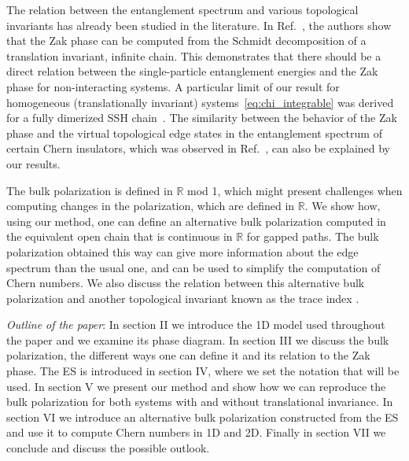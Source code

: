 \documentclass[twocolumn,amsmath,longbibliography,amssymb,superscriptaddress]{revtex4-1}
\begin{document}
The relation between the entanglement spectrum and various topological invariants has already been studied in the literature. 
In Ref.~\cite{Zaletel2014}, the authors show that the Zak phase can be computed from the Schmidt decomposition of a translation invariant, infinite chain. 
This demonstrates that there should be a direct relation between the single-particle entanglement energies and the Zak phase for non-interacting systems. A particular limit of our result for homogeneous (translationally invariant) systems~\eqref{eq:chi_integrable} was derived 
for a fully dimerized SSH chain~\cite{Ryu2006}. 
The similarity between the behavior of the Zak phase and the virtual topological edge states in the entanglement spectrum of certain Chern insulators, which was observed in Ref.~\cite{Huang2012,Huang2012-2}, can also be explained by our results. 

The bulk polarization is defined in $\mathbb{R}$ mod 1, which might present challenges when computing changes in the polarization, which are defined  in $\mathbb{R}$. We show how, using our method, one can define an alternative bulk polarization computed in the equivalent open chain that is continuous in $\mathbb{R}$ for gapped paths. The bulk polarization obtained this way can give more information about the edge spectrum than the usual one, and can be used to simplify the computation of Chern numbers. We also discuss the relation between this alternative bulk polarization and another topological invariant known as the trace index \cite{Alexandrinata2011}.

\emph{Outline of the paper}: In section II we introduce the 1D model used throughout the paper and we examine its phase diagram. In section III we discuss the bulk polarization, the different ways one can define it and its relation to the Zak phase. The ES is introduced in section IV, where we set the notation that will be used. In section V we present our method and show how we can reproduce the bulk polarization for both systems with and without translational invariance. In section VI we introduce an alternative bulk polarization constructed from the ES and use it to compute Chern numbers in 1D and 2D. Finally in section VII we conclude and discuss the possible outlook.

\end{document}
